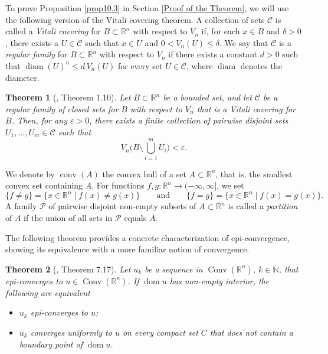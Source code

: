 \documentclass[11pt]{article}
\newtheorem{teo}{Theorem}
\theoremstyle{definition} %
\newcommand{\RR}{(\mathbb{R}^n)}
\DeclareMathOperator{\conv}{conv}
\DeclareMathOperator{\Conv}{Conv}
\DeclareMathOperator{\dom}{dom}
\DeclareMathOperator{\diam}{diam}
\begin{document}
To prove Proposition \ref{prop10.3} in Section \ref{Proof of the Theorem}, we will use the following version of the Vitali covering theorem.  A collection of sets $\mathcal{C}$ is called a \textit{Vitali covering} for $B \subset \mathbb{R}^n$ with respect to $V_n$ if, for each $x\in B$ and $\delta> 0$, there exists a $U\in \mathcal{C}$ such that $x\in U$ and $0<V_n(U)\leq \delta$. We say that  $\mathcal{C}$ is  a  \emph{regular family} for $B \subset \mathbb{R}^n$  with respect to $V_n$ if there exists a constant $d>0$ such that $\diam (U)^n\leq d \, V_n(U)$ for every set $U\in \mathcal{C}$,  where $\operatorname{diam}$ denotes the diameter.



\begin{teo}[\cite{falconer1985geometry}, Theorem 1.10]\label{VCT}
Let $ B\subset \mathbb{R}^n$ be a bounded set, and let $\mathcal{C}$ be a regular family of closed sets for $B$  with respect to $V_n$ that is a Vitali covering for $B$. Then, for any $\varepsilon > 0$, there exists a finite collection of pairwise disjoint sets $U_1, \dots, U_m \in \mathcal{C}$ such that
$$
V_n\Big(B \setminus \bigcup_{i=1}^m U_i \Big) < \varepsilon.
$$
\end{teo}



We  denote by  $\conv(A)$ the convex hull of a set $A\subset\mathbb{R}^n$, that is, the smallest convex set containing $A$.   For functions $f,g:\mathbb{R}^n \to (-\infty,\infty]$, we set
$$\{f\neq g\}=\{x\in\mathbb{R}^n\mid f(x)\neq g(x)\}\qquad \mbox{and} \qquad \{f=g\}=\{x\in\mathbb{R}^n\mid f(x)= g(x)\}.$$
A family $\mathcal{P}$ of pairwise disjoint non-empty subsets of $A \subset \mathbb{R}^n$ is called a \textit{partition} of $A$ if the union of all sets in $\mathcal{P}$ equals $A$. 

\medskip














The following theorem provides a concrete characterization of epi-convergence, showing its equivalence with a more familiar notion of convergence. 

\begin{teo}[\cite{rockafellar2009variational}, Theorem 7.17]\label{equivalence}
Let $u_k$ be a sequence in $\Conv\RR$, $k\in\mathbb{N}$,  that epi-converges to $u\in\Conv\RR$. If $\dom u$ has non-empty interior, the following are equivalent
\begin{itemize}
    \item[(1)] $u_k$ epi-converges to $u$;
    \item[(2)] $u_k$ converges uniformly to $u$ on every compact set $C$ that does not contain a boundary point of $\dom u$.
\end{itemize}
\end{teo}
\end{document}
